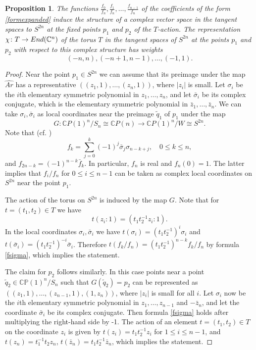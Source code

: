 \documentclass[10pt,a4paper]{amsart}
\newtheorem{prop}{Proposition}
\newcommand{\CP}{\mathbb{CP}}
\begin{document}
\begin{prop}\label{third}
    The functions $\frac{f_0}{f_n},\frac{f_1}{f_n},\dots,\frac{f_{n-1}}{f_n}$ of the coefficients of the form \eqref{formexpanded} induce the structure of a complex vector space in the tangent spaces to $S^{2n}$ at the fixed points  $p_1$ and $p_2$ of the $T$-action. The representation $\chi\colon T \to {\rm End}(\mathbb C^n)$ of the torus $T$ in the tangent spaces of $S^{2n}$ at the points $p_1$ and $p_2$ with respect to this complex structure has weights 
    \[
    (-n,n), (-n+1, n-1), \ldots, (-1, 1). 
    \]
\end{prop}

    \begin{proof}
    
        Near the point $p_1\in S^{2n}$ we can assume that its preimage under the map $\widehat{Ar}$ 
        has a representative $\left((z_1,1), \ldots, (z_n, 1)\right)$, where 
$|z_i|$ is small. Let $\sigma_i$ be the $i$th elementary symmetric polynomial in $z_1, \ldots, z_n$, and let $\bar \sigma_i$ be its complex conjugate, which is the elementary symmetric polynomial in $\bar z_1, \ldots, \bar z_n$. We can take $\sigma_i, \bar\sigma_i$ as local coordinates near the preimage $\tilde q_1$ of $p_1$  under the map 
    $$
    G\colon \mathbb{C}P(1)^n/S_n\cong \mathbb{C}P(n) \to \mathbb{C}P(1)^n/W\cong S^{2n}.
    $$ Note that (cf. \cite{Arnold1996})
\begin{equation}
    \label{fsigma}
f_k = \sum_{j=0}^k (-1)^j \bar \sigma_j \sigma_{n-k+j}, \quad 0\le k \le n,
\end{equation}
and $f_{2n-k} = (-1)^{n-k} \bar f_k$. In particular, $f_n$ is real and $f_n(0)=1$. The latter implies that $f_i/f_n$ for  $0\le i \le n-1$ can be taken as complex local coordinates on $S^{2n}$ near the point $p_1$. 
 
The action of the torus on $S^{2n}$ is induced by the map $G$. Note that for $t=(t_1, t_2) \in T$ we have 
\begin{equation*}
\label{tz}   
t (z_i:1) = ( t_1 t_2^{-1} z_i:1).
\end{equation*}
  In the local coordinates $\sigma_i,\bar \sigma_i$ we have 
$t(\sigma _i) = (t_1 t_2^{-1})^i \sigma_i$ and $t(\bar \sigma_i) = (t_1 t_2^{-1})^{-i} \bar\sigma_i$. Therefore $t(f_k/f_n) = (t_1 t_2^{-1})^{n-k} f_k/f_n$ by formula \eqref{fsigma}, which implies the statement. 

The claim for $p_2$ follows similarly. In this case points near a point $\tilde q_2\in \CP(1)^n/S_n$ such that $G(\tilde q_2)=p_2$ can be represented as $\left((z_1, 1), \ldots, (z_{n-1}, 1), (1, z_n)\right)$, where $|z_i|$ is small for all $i$. 
Let $\sigma_i$ now be the $i$th elementary symmetric polynomial in $z_1, \ldots, z_{n-1}$ and $-\bar z_n$, and let the coordinate $\bar \sigma_i$ be its complex conjugate. Then  formula \eqref{fsigma} holds after multiplying the right-hand side by -1. The action of an element $t=(t_1, t_2)\in T$  on the coordinate $z_i$ is given by $t(z_i) = t_1 t_2^{-1} z_i$ for $1\le i \le n-1$, and $t(z_n)=t_1^{-1} t_2 z_n$, $t(\bar z_n)=t_1 t_2^{-1} \bar z_n$, which implies the statement. 
    \end{proof}
\end{document}
